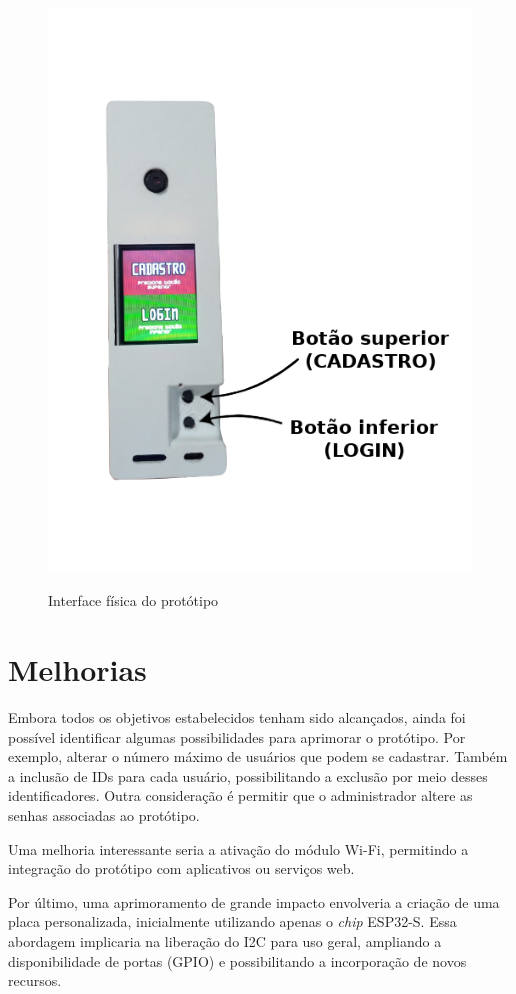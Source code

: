 \begin{figure}[h!]
    \centering
    \caption{Interface física do protótipo}
    \includegraphics[scale=0.4]{figuras/placa_botoes.png}
    \fonte{}%
    \label{fig:botoesplaca}
    \centering
\end{figure}

\section{Melhorias}\label{sec:melhorias}

Embora todos os objetivos estabelecidos tenham sido alcançados, 
ainda foi possível identificar algumas possibilidades para 
aprimorar o protótipo. Por exemplo, 
alterar o número máximo de usuários que podem se cadastrar. 
Também a inclusão de IDs para cada usuário, possibilitando a exclusão 
por meio desses identificadores. Outra consideração é permitir que 
o administrador altere as senhas associadas ao protótipo.

Uma melhoria interessante seria a ativação do módulo Wi-Fi, 
permitindo a integração do protótipo com aplicativos ou 
serviços web.

Por último, uma aprimoramento de grande impacto envolveria a 
criação de uma placa personalizada, inicialmente utilizando 
apenas o  \textit{chip} 
ESP32-S. Essa abordagem implicaria na liberação do I2C para 
uso geral, ampliando a disponibilidade de portas (GPIO) e 
possibilitando a incorporação de novos recursos.